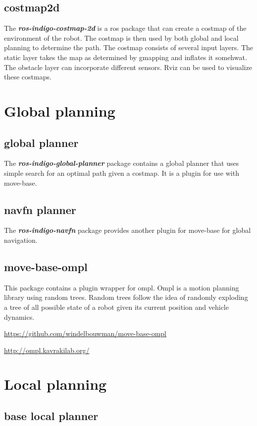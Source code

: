 \documentclass[a4paper]{article}
\newcommand{\rospackage}[1]{\textbf{\textit{#1}}}
\begin{document}
\subsection{costmap2d}
The \rospackage{ros-indigo-costmap-2d} is a ros package that can create a costmap of the environment
of the robot.
The costmap is then used by both global and local planning to determine the path.
The costmap consists of several input layers. The static layer takes the map as determined by
gmapping and inflates it somehwat. The obstacle layer can incorporate different sensors.
Rviz can be used to visualize these costmaps.

\section{Global planning}

\subsection{global planner}
The \rospackage{ros-indigo-global-planner} package contains a global planner that uses simple search
for an optimal path given a costmap. It is a plugin for use with move-base.

\subsection{navfn planner}
The \rospackage{ros-indigo-navfn} package provides another plugin for move-base for global navigation.

\subsection{move-base-ompl}
This package contains a plugin wrapper for ompl. Ompl is a motion planning library using random trees.
Random trees follow the idea of randomly exploding a tree of all possible state of a robot
given its current position and vehicle dynamics.

\url{https://github.com/windelbouwman/move-base-ompl}

\url{http://ompl.kavrakilab.org/}

\section{Local planning}

\subsection{base local planner}
\end{document}
